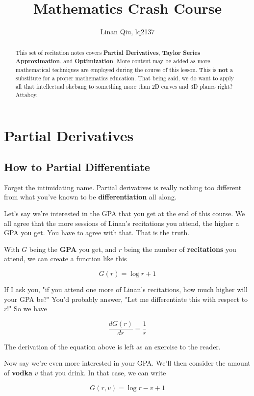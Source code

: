 \documentclass[11pt]{scrartcl}
\title{Mathematics Crash Course}
\author{Linan Qiu, lq2137}
\begin{document}
\maketitle

\begin{abstract}
This set of recitation notes covers \textbf{Partial Derivatives}, \textbf{Taylor Series Approximation}, and \textbf{Optimization}. More content may be added as more mathematical techniques are employed during the course of this lesson. This is \textbf{not} a substitute for a proper mathematics education. That being said, we do want to apply all that intellectual shebang to something more than 2D curves and 3D planes right? Attaboy.
\end{abstract}

\section{Partial Derivatives}

\subsection{How to Partial Differentiate}
Forget the intimidating name. Partial derivatives is really nothing too different from what you've known to be \textbf{differentiation} all along.

Let's say we're interested in the GPA that you get at the end of this course. We all agree that the more sessions of Linan's recitations you attend, the higher a GPA you get. You have to agree with that. That is the truth.

With $G$ being the \textbf{GPA} you get, and $r$ being the number of \textbf{recitations} you attend, we can create a function like this

\[G(r) = \log{r} + 1 \]

If I ask you, "if you attend one more of Linan's recitations, how much higher will your GPA be?" You'd probably answer, "Let me differentiate this with respect to $r$!" So we have

\[ \frac{d G(r)}{d r} = \frac{1}{r} \]

The derivation of the equation above is left as an exercise to the reader. 

Now say we're even more interested in your GPA. We'll then consider the amount of \textbf{vodka} $v$ that you drink. In that case, we can write

\[G(r, v) = \log{r} - v + 1\] 
\end{document}
